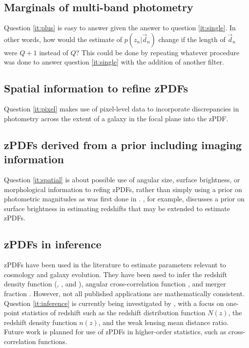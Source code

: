 \documentclass[12pt, onecolumn]{emulateapj}
\begin{document}
\subsection{Marginals of multi-band photometry}

Question \ref{it:plus} is easy to answer given the answer to question \ref{it:single}.  In other words, how would the estimate of $p(z_{n}|\vec{d}_{n})$ change if the length of $\vec{d}_{n}$ were $Q+1$ instead of $Q$?  This could be done by repeating whatever procedure was done to answer question \ref{it:single} with the addition of another filter.

\subsection{Spatial information to refine zPDFs}

Question \ref{it:pixel} makes use of pixel-level data to incorporate discrepancies in photometry across the extent of a galaxy in the focal plane into the zPDF.

\subsection{zPDFs derived from a prior including imaging information}

Question \ref{it:spatial} is about possible use of angular size, surface brightness, or morphological information to refing zPDFs, rather than simply using a prior on photometric magnitudes as was first done in \citet{ben00}.  \citet{sta07}, for example, discusses a prior on surface brightness in estimating redshifts that may be extended to estimate zPDFs.

\subsection{zPDFs in inference}

zPDFs have been used in the literature to estimate parameters relevant to cosmology and galaxy evolution.  They have been used to infer the redshift density function (\citet{she11}, \citet{bon13}, and \citet{vii15}), angular cross-correlation function \citep{mye09}, and merger fraction \citep{lop14}.  However, not all published applications are mathematically consistent.   Question \ref{it:inference} is currently being investigated by \citet{mal15}, with a focus on one-point statistics of redshift such as the redshift distribution function $N(z)$, the redshift density function $n(z)$, and the weak lensing mean distance ratio.  Future work is planned for use of zPDFs in higher-order statistics, such as cross-correlation functions.  
\end{document}
